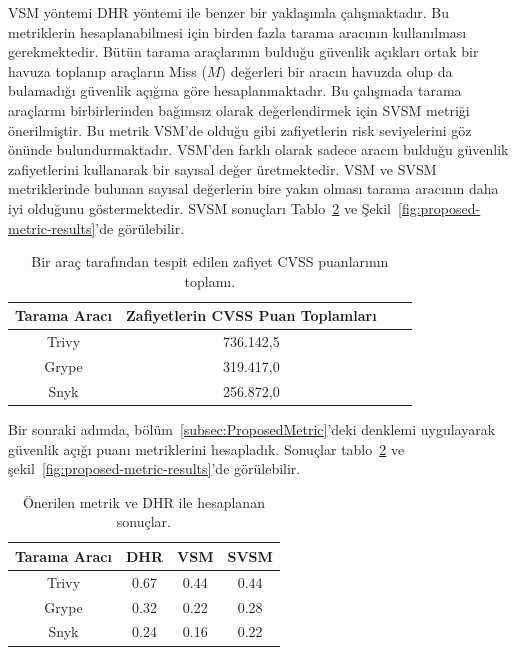 VSM yöntemi DHR yöntemi ile benzer bir yaklaşımla çalışmaktadır. Bu metriklerin hesaplanabilmesi için birden fazla tarama aracının kullanılması gerekmektedir. Bütün tarama araçlarının bulduğu güvenlik açıkları ortak bir havuza toplanıp araçların Miss ($M$) değerleri bir aracın havuzda olup da bulamadığı güvenlik açığına göre hesaplanmaktadır. Bu çalışmada tarama araçlarını birbirlerinden bağımsız olarak değerlendirmek için  SVSM metriği önerilmiştir. Bu metrik VSM'de olduğu gibi zafiyetlerin risk seviyelerini göz önünde bulundurmaktadır. VSM'den farklı olarak sadece aracın bulduğu güvenlik zafiyetlerini kullanarak bir sayısal değer üretmektedir. VSM ve SVSM metriklerinde bulunan sayısal değerlerin bire yakın olması tarama aracının daha iyi olduğunu göstermektedir. SVSM sonuçları Tablo~\ref{tab:proposed-metric-results} ve Şekil~\ref{fig:proposed-metric-results}'de görülebilir.

\begin{table}[!htbp]
    \caption{Bir araç tarafından tespit edilen zafiyet CVSS puanlarının toplamı.}\label{tab:vuln-sum}
    \centering
    \begin{tabular}{ |c|c|c|c| }
        \hline
        Tarama Aracı & Zafiyetlerin CVSS Puan Toplamları \\
        \hline
        Trivy & 736.142,5 \\
        Grype & 319.417,0 \\
        Snyk  & 256.872,0 \\
        \hline
    \end{tabular}
\end{table}

Bir sonraki adımda, bölüm~\ref{subsec:ProposedMetric}'deki denklemi uygulayarak güvenlik açığı puanı metriklerini hesapladık. Sonuçlar tablo~\ref{tab:proposed-metric-results} ve şekil~\ref{fig:proposed-metric-results}'de görülebilir.

\begin{table}[!htbp]
    \caption{Önerilen metrik ve DHR ile hesaplanan sonuçlar.}\label{tab:proposed-metric-results}
    \centering
    \begin{tabular}{ |c|c|c|c| }
        \hline
        Tarama Aracı & DHR & VSM & SVSM \\
        \hline
        Trivy & 0.67 & 0.44 & 0.44 \\
        Grype & 0.32 & 0.22 & 0.28 \\
        Snyk  & 0.24 & 0.16 & 0.22 \\
        \hline
    \end{tabular}
\end{table}

